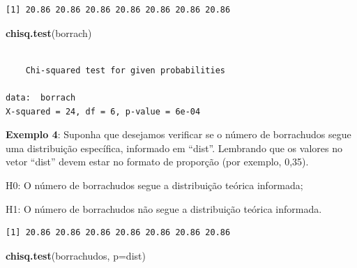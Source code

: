 \documentclass[12pt,brazil,oneside]{book}
\newenvironment{Shaded}{\begin{snugshade}}{\end{snugshade}}
\newcommand{\DataTypeTok}[1]{\textcolor[rgb]{0.13,0.29,0.53}{#1}}
\newcommand{\DecValTok}[1]{\textcolor[rgb]{0.00,0.00,0.81}{#1}}
\newcommand{\FloatTok}[1]{\textcolor[rgb]{0.00,0.00,0.81}{#1}}
\newcommand{\KeywordTok}[1]{\textcolor[rgb]{0.13,0.29,0.53}{\textbf{#1}}}
\newcommand{\NormalTok}[1]{#1}
\newcommand{\OperatorTok}[1]{\textcolor[rgb]{0.81,0.36,0.00}{\textbf{#1}}}
\begin{document}
\begin{verbatim}
[1] 20.86 20.86 20.86 20.86 20.86 20.86 20.86
\end{verbatim}

\begin{Shaded}
\begin{Highlighting}[]
\KeywordTok{chisq.test}\NormalTok{(borrach)}
\end{Highlighting}
\end{Shaded}

\begin{verbatim}

    Chi-squared test for given probabilities

data:  borrach
X-squared = 24, df = 6, p-value = 6e-04
\end{verbatim}

\textbf{Exemplo 4}: Suponha que desejamos verificar se o número de
borrachudos segue uma distribuição específica, informado em ``dist''.
Lembrando que os valores no vetor ``dist'' devem estar no formato de
proporção (por exemplo, 0,35).

H0: O número de borrachudos segue a distribuição teórica informada;

H1: O número de borrachudos não segue a distribuição teórica informada.

\begin{Shaded}
\end{Shaded}

\begin{verbatim}
[1] 20.86 20.86 20.86 20.86 20.86 20.86 20.86
\end{verbatim}

\begin{Shaded}
\begin{Highlighting}[]
\KeywordTok{chisq.test}\NormalTok{(borrachudos, }\DataTypeTok{p=}\NormalTok{dist)}
\end{Highlighting}
\end{Shaded}
\end{document}
